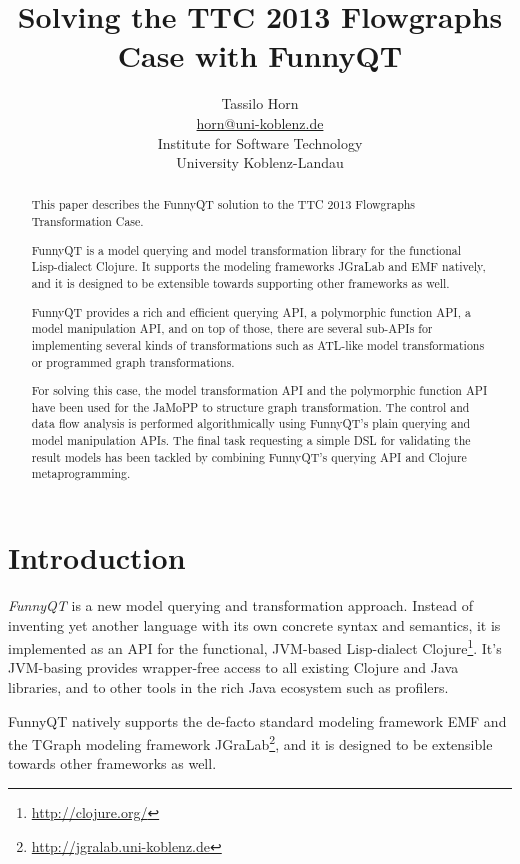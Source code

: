 \documentclass[11pt]{article}
\title{Solving the TTC 2013 Flowgraphs Case with FunnyQT}
\author{Tassilo Horn\\
  \href{mailto:horn@uni-koblenz.de}{horn@uni-koblenz.de}\\
  Institute for Software Technology\\
  University Koblenz-Landau}
\begin{document}
\maketitle

\begin{abstract}
  This paper describes the FunnyQT solution to the TTC 2013 Flowgraphs
  Transformation Case.

  FunnyQT is a model querying and model transformation library for the
  functional Lisp-dialect Clojure.  It supports the modeling frameworks JGraLab
  and EMF natively, and it is designed to be extensible towards supporting
  other frameworks as well.

  FunnyQT provides a rich and efficient querying API, a polymorphic function
  API, a model manipulation API, and on top of those, there are several
  sub-APIs for implementing several kinds of transformations such as ATL-like
  model transformations or programmed graph transformations.

  For solving this case, the model transformation API and the polymorphic
  function API have been used for the JaMoPP to structure graph transformation.
  The control and data flow analysis is performed algorithmically using
  FunnyQT's plain querying and model manipulation APIs.  The final task
  requesting a simple DSL for validating the result models has been tackled by
  combining FunnyQT's querying API and Clojure metaprogramming.
\end{abstract}

\section{Introduction}
\label{sec:introduction}

\emph{FunnyQT} is a new model querying and transformation approach.  Instead of
inventing yet another language with its own concrete syntax and semantics, it
is implemented as an API for the functional, JVM-based Lisp-dialect
Clojure\footnote{\url{http://clojure.org/}}.  It's JVM-basing provides
wrapper-free access to all existing Clojure and Java libraries, and to other
tools in the rich Java ecosystem such as profilers.

FunnyQT natively supports the de-facto standard modeling framework EMF
\cite{Steinberg2008EEM} and the TGraph modeling framework
JGraLab\footnote{\url{http://jgralab.uni-koblenz.de}}, and it is designed to be
extensible towards other frameworks as well.
\end{document}

